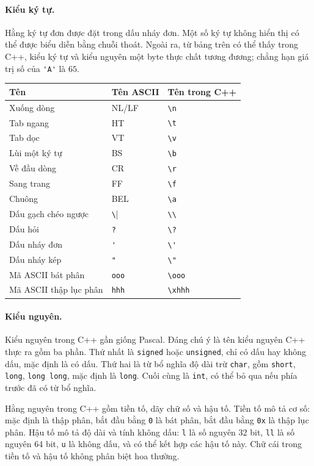 \documentclass[11pt]{article}
\newcommand{\cpp}{C++}
\newcommand{\pascal}{Pascal}
\begin{document}
\paragraph{Kiểu ký tự.}
Hằng ký tự đơn được đặt trong dấu nháy đơn. Một số ký tự không hiển thị có thể
được biểu diễn bằng chuỗi thoát. Ngoài ra, từ bảng trên có thể thấy trong
\cpp{}, kiểu ký tự và kiểu nguyên một byte thực chất tương đương; chẳng hạn
giá trị số của \verb|'A'| là \(65\).

\begin{center}
\begin{tabular}{lll}
\hline
\textbf{Tên} & \textbf{Tên ASCII} & \textbf{Tên trong \cpp{}}\\
\hline
Xuống dòng & NL/LF & \verb|\n|\\
Tab ngang & HT & \verb|\t|\\
Tab dọc & VT & \verb|\v|\\
Lùi một ký tự & BS & \verb|\b|\\
Về đầu dòng & CR & \verb|\r|\\
Sang trang & FF & \verb|\f|\\
Chuông & BEL & \verb|\a|\\
Dấu gạch chéo ngược & \verb|\| & \verb|\\|\\
Dấu hỏi & \verb|?| & \verb|\?|\\
Dấu nháy đơn & \verb|'| & \verb|\'|\\
Dấu nháy kép & \verb|"| & \verb|\"|\\
Mã ASCII bát phân & \verb|ooo| & \verb|\ooo|\\
Mã ASCII thập lục phân & \verb|hhh| & \verb|\xhhh|\\
\hline
\end{tabular}
\end{center}

\paragraph{Kiểu nguyên.}
Kiểu nguyên trong \cpp{} gần giống \pascal{}. Đáng chú ý là tên kiểu nguyên
\cpp{} thực ra gồm ba phần. Thứ nhất là \verb|signed| hoặc \verb|unsigned|,
chỉ có dấu hay không dấu, mặc định là có dấu. Thứ hai là từ bổ nghĩa độ dài
trừ \verb|char|, gồm \verb|short|, \verb|long|, \verb|long long|, mặc định là
\verb|long|. Cuối cùng là \verb|int|, có thể bỏ qua nếu phía trước đã có từ
bổ nghĩa.

Hằng nguyên trong \cpp{} gồm tiền tố, dãy chữ số và hậu tố. Tiền tố mô tả cơ
số: mặc định là thập phân, bắt đầu bằng \verb|0| là bát phân, bắt đầu bằng
\verb|0x| là thập lục phân. Hậu tố mô tả độ dài và tính không dấu:
\verb|l| là số nguyên 32 bit, \verb|ll| là số nguyên 64 bit, \verb|u| là không
dấu, và có thể kết hợp các hậu tố này. Chữ cái trong tiền tố và hậu tố không
phân biệt hoa thường.
\end{document}
